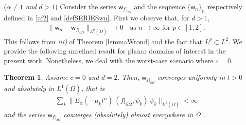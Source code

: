\documentclass[11pt,a4paper]{article}
\newtheorem{theorem}{Theorem}[section]
\begin{document}
({\it $\alpha \neq 1$ and $d>1$}) Consider the series $\mathsf{w}_{f|_{\partial \Omega}}$ and the sequence $\{\mathsf{w}_n\}_n$ respectively defined in \eqref{uf2} and \eqref{defSERIESwn}. First we observe that, for $d > 1$, 
\begin{align*}
\| \mathsf{w}_n - \mathsf{w}_{f|_{\partial \Omega}}\|_{L^p(\bar{\Omega})} \to 0 \quad \textrm{as $n \to \infty$ for $p \in [1,2]$}.
\end{align*}
This follows from \textit{iii)} of Theorem \ref{lemmaWrond} and the fact that $L^p \subset L^2$. We provide the following unrefined result for planar domains of interest in the present work. Nonetheless, we deal with the worst-case scenario where $c=0$. 

\begin{theorem}
Assume $c=0$ and $d=2$.  Then, $\mathsf{w}_{f|_{\partial \Omega}}$ converges uniformly in $t>0$ and absolutely in $L^1(\bar{\Omega})$, that is  
\begin{align}
\sum_{k} \| E_\alpha(-\mu_k t^\alpha)\, (f|_{\partial \Omega}, \psi_k)\, \psi_k \|_{L^1(\bar{\Omega})} < \infty
\label{absL1}
\end{align}
and the series $\mathsf{w}_{f|_{\partial \Omega}}$ converges (absolutely) almost everywhere in $\bar{\Omega}$ .
\end{theorem}
\end{document}
